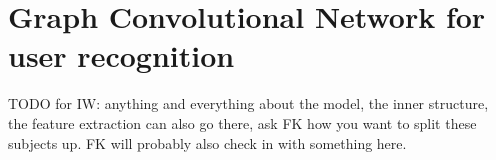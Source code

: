 
\section{Graph Convolutional Network for user recognition}

TODO for IW: anything and everything about the model, the inner structure, the feature extraction can also go there, ask FK how you want to split these subjects up. FK will probably also check in with something here.